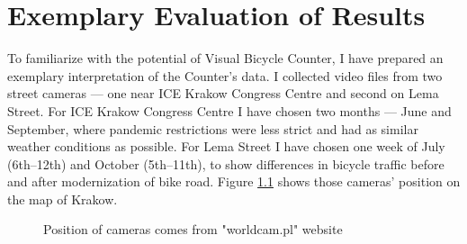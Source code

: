 \chapter{Exemplary Evaluation of Results}
\label{cha:results}
To familiarize with the potential of Visual Bicycle Counter, I have prepared an exemplary interpretation of the Counter's data. I collected video files from two street cameras --- one near ICE Krakow Congress Centre and second on Lema Street. For ICE Krakow Congress Centre I have chosen two months --- June and September, where pandemic restrictions were less strict and had as similar weather conditions as possible. For Lema Street I have chosen one week of July (6th--12th) and October (5th--11th), to show differences in bicycle traffic before and after modernization of bike road. Figure \ref{fig:map} shows those cameras' position on the map of Krakow.
\begin{figure}[H]
    \centering
    \caption{Position of cameras comes from "worldcam.pl" website \cite{mapa}}
    \label{fig:map}
\end{figure}

